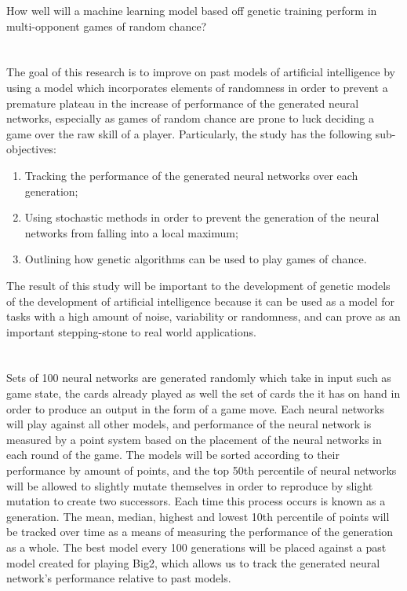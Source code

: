 \documentclass[]{article}
\begin{document}
How well will a machine learning model based off genetic training perform in multi-opponent games of random chance?

\section*{}

The goal of this research is to improve on past models of artificial intelligence by using a model which incorporates elements of randomness in order to prevent a premature plateau in the increase of performance of the generated neural networks, especially as games of random chance are prone to luck deciding a game over the raw skill of a player. Particularly, the study has the following sub-objectives:

\begin{enumerate}
	\item Tracking the performance of the generated neural networks over each generation;
	\item Using stochastic methods in order to prevent the generation of the neural networks from falling into a local maximum;
	\item Outlining how genetic algorithms can be used to play games of chance.
	
\end{enumerate}

The result of this study will be important to the development of genetic models of the development of artificial intelligence because it can be used as a model for tasks with a high amount of noise, variability or randomness, and can prove as an important stepping-stone to real world applications. 

\section*{}

Sets of 100 neural networks are generated randomly which take in input such as game state, the cards already played as well the set of cards the it has on hand in order to produce an output in the form of a game move. Each neural networks will play against all other models, and performance of the neural network is measured by a point system based on the placement of the neural networks in each round of the game. The models will be sorted according to their performance by amount of points, and the top 50th percentile of neural networks will be allowed to slightly mutate themselves in order to reproduce by slight mutation to create two successors. Each time this process occurs is known as a generation. The mean, median, highest and lowest 10th percentile of points will be tracked over time as a means of measuring the performance of the generation as a whole. The best model every 100 generations will be placed against a past model created for playing Big2, which allows us to track the generated neural network's performance relative to past models.
\end{document}
